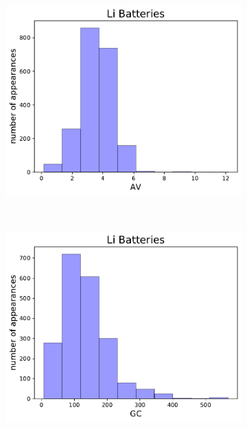  \begin{figure}[h]
     \centering
     \begin{subfigure}{0.3\textwidth}
         \centering
         \includegraphics[width=\linewidth]{result/figures/columnsplotLi_AV.pdf}
         \caption{}
     \end{subfigure}
     ~ 
     \begin{subfigure}{0.3\textwidth}
         \centering
         \includegraphics[width=\linewidth]{result/figures/columnsplotLi_GC.pdf}
         \caption{}
     \end{subfigure}
          ~ 

\end{figure}
